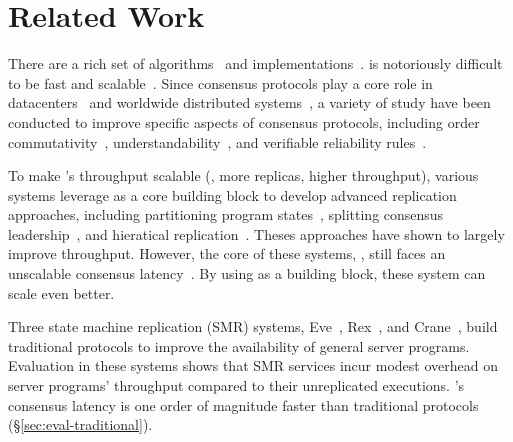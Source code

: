 \section{Related Work} \label{sec:related}


 There are a rich set of
\paxos algorithms~\cite{paxos:practical,paxos,paxos:simple,paxos:complex,
epaxos:sosp13} and 
implementations~\cite{paxos:live,paxos:practical,chubby:osdi,crane:sosp15}. 
\paxos is notoriously difficult to be fast and 
scalable~\cite{ellis:thesis,manos:hotdep10,scatter:sosp11}. Since consensus 
protocols play a core role in datacenters~\cite{matei:hotcloud11, mesos:nsdi11, 
datacenter:os} and worldwide 
distributed systems~\cite{spanner:osdi12,mencius:osdi08}, a variety of study 
have been conducted to improve specific aspects of consensus protocols, 
including order commutativity~\cite{epaxos:sosp13}, 
understandability~\cite{raft:usenix14,paxos}, and verifiable reliability 
rules~\cite{modist:nsdi09,demeter:sosp11}.



To make \paxos's throughput scalable (\ie, more replicas, higher throughput), 
various systems leverage \paxos as a core building block to develop advanced 
replication approaches, including partitioning program 
states~\cite{scatter:sosp11,dssmr,ssmr}, splitting consensus 
leadership~\cite{mencius:osdi08,spaxos}, and hieratical 
replication~\cite{manos:hotdep10,scatter:sosp11}. Theses approaches have shown 
to largely improve throughput. However, the core of these systems, 
\paxos, still faces an unscalable consensus 
latency~\cite{ellis:thesis,scatter:sosp11,manos:hotdep10}. By using \xxx as a 
building block, these system can scale even better.




Three state machine replication (SMR) systems, Eve~\cite{eve:osdi12}, 
Rex~\cite{rex:eurosys14}, and Crane~\cite{crane:sosp15}, build traditional 
\paxos protocols to improve the availability of general server programs. 
Evaluation in these systems shows that SMR services incur modest overhead on 
server programs' throughput compared to their unreplicated executions. \xxx's 
consensus latency is one order of magnitude faster than traditional protocols 
(\S\ref{sec:eval-traditional}).

